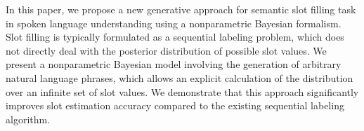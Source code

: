 In this paper, we propose a new generative approach for semantic slot filling task in spoken language understanding using a nonparametric Bayesian formalism. Slot filling is typically formulated as a sequential labeling problem, which does not directly deal with the posterior distribution of possible slot values. We present a nonparametric Bayesian model involving the generation of arbitrary natural language phrases, which allows an explicit calculation of the distribution over an infinite set of slot values. We demonstrate that this approach significantly improves slot estimation accuracy compared to the existing sequential labeling algorithm.
